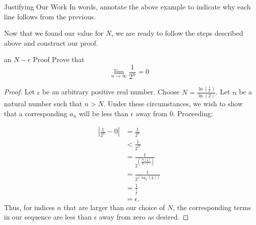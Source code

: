 \begin{exercise}{Justifying Our Work \Coffeecup}
In words, annotate the above example to indicate why each line follows from the previous.
\end{exercise}

Now that we found our value for $N$, we are ready to follow the steps described above and construct our proof.

\begin{example}{ an $N-\epsilon$ Proof}
Prove that $$\lim_{n\rightarrow \infty}\frac{1}{2^n}=0 $$
\begin{proof}
Let $\epsilon$ be an arbitrary positive real number.  Choose $N=\frac{\ln\left(\frac{1}{\epsilon}\right)}{\ln\left(2\right)}$.  Let $n$ be a natural number such that $n>N$.  Under these circumstances, we wish to show that a corresponding $a_n$ will be less than $\epsilon$ away from $0$.  Proceeding:

\begin{align*}
\left|\frac{1}{2^n}-0\right|&=\frac{1}{2^n} \\
&<\frac{1}{2^N} \\
&=\frac{1}{2^{\left(\frac{\ln\left(\frac{1}{\epsilon}\right)}{\ln\left(2\right)}\right)}} \\
&=\frac{1}{2^{\left(\log_2\left(\frac{1}{\epsilon}\right)\right)}} \\
&=\frac{1}{\frac{1}{\epsilon}} \\
&=\epsilon.
\end{align*}
Thus, for indices $n$ that are larger than our choice of $N$, the corresponding terms in our sequence are less than $\epsilon$ away from zero as desired.
\end{proof}
\end{example}

